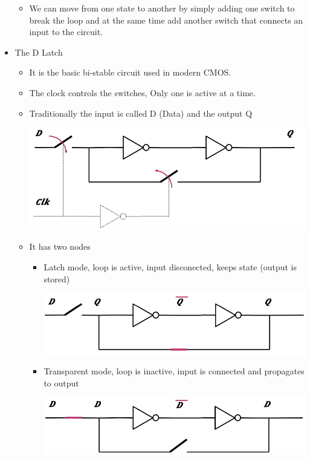 \documentclass[a4paper]{article}
\begin{document}
\begin{itemize}
\begin{itemize}
\begin{center}
					\end{center}
				\item We can move from one state to another by simply adding one switch to break the loop and at the same time add another switch that connects an input to the circuit.
			\end{itemize}
		\item The D Latch
			\begin{itemize}
				\item It is the basic bi-stable circuit used in modern CMOS.
				\item The clock controls the switches, Only one is active at a time.
				\item Traditionally the input is called D (Data) and the output Q\\
				\begin{center}
						\includegraphics[scale=0.95]{Figures/DLatch.jpg}
				\end{center}
				\item It has two nodes 
					\begin{itemize}
						\item Latch mode, loop is active, input disconected, keeps state (output is stored)\\
						\begin{center}
							\includegraphics[scale=1]{Figures/LatchMode.jpg}
						\end{center}
						\item Transparent mode, loop is inactive, input is connected and propagates to output\\
						\begin{center}
							\includegraphics[scale=1]{Figures/TransparentMode.jpg}

\end{center}
\end{itemize}
\end{itemize}
\end{itemize}
\end{document}
